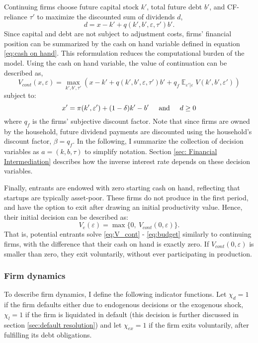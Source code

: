 \documentclass[12pt]{article}
\DeclareMathOperator{\E}{\mathbb{E}}
\begin{document}
Continuing firms choose future capital stock $k'$, total future debt $b'$, and CF-reliance $\tau'$ to maximize the discounted sum of dividends $d$, 
\begin{equation} \label{eq:dividends}
d = x - k' +  q(k',b',\varepsilon, \tau')b'.
\end{equation} 
Since capital and debt are not subject to adjustment costs, firms' financial position can be summarized by the cash on hand variable defined in equation \ref{eq:cash on hand}. This reformulation reduces the computational burden of the model. Using the cash on hand variable, the value of continuation can be described as,
\begin{equation} \label{eq:V_cont}
 V_{cont}(x,\varepsilon) = \max_{k',b', \tau'} \left(x - k' +  q(k',b',\varepsilon, \tau')b' + q_f \E_{\varepsilon'|\varepsilon} V(k',b', \varepsilon') \right)
\end{equation}
subject to: 
\begin{equation} \label{eq:budget}
x' = \pi(k',\varepsilon')+(1-\delta)k'-b' \hspace{5mm} \text{and} \hspace{5mm} d \geq 0
\end{equation} 
where $q_f$ is the firms' subjective discount factor. Note that since firms are owned by the household, future dividend payments are discounted using the household's discount factor, $\beta = q_f$. In the following, I summarize the collection of decision variables as $a = (k, b, \tau) $ to simplify notation. Section \ref{sec: Financial Intermediation} describes how the inverse interest rate depends on these decision variables. 

Finally, entrants are endowed with zero starting cash on hand, reflecting that startups are typically asset-poor. These firms do not produce in the first period, and have the option to exit after drawing an initial productivity value. Hence, their initial decision can be described as: 
\begin{equation} \label{eq:entrant decision}
 V_e(\varepsilon) = \max \{0, \ V_{cont}(0,\varepsilon) \}.
\end{equation}
That is, potential entrants solve \ref{eq:V_cont} - \ref{eq:budget} similarly to continuing firms, with the difference that their cash on hand is exactly zero. If $V_{cont}(0,\varepsilon)$ is smaller than zero, they exit voluntarily, without ever participating in production.

\subsubsection{Firm dynamics}
To describe firm dynamics, I define the following indicator functions. Let $\chi_{d} = 1$ if the firm defaults either due to endogenous decisions or the exogenous shock, $\chi_l = 1$ if the firm is liquidated in default (this decision is further discussed in section \ref{sec:default resolution}) and let $\chi_{ex} = 1$ if the firm exits voluntarily, after fulfilling its debt obligations. 
\end{document}
